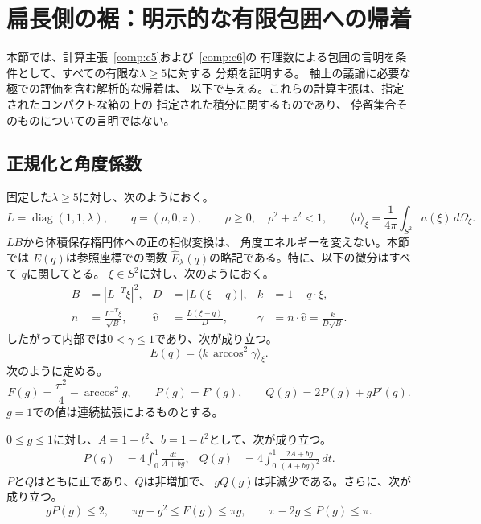 \section{扁長側の裾：明示的な有限包囲への帰着}
\label{sec:prolate-tail}

本節では、計算主張~\ref{comp:c5}および~\ref{comp:c6}の
有理数による包囲の言明を条件として、すべての有限な$\lambda\geq 5$に対する
分類を証明する。
軸上の議論に必要な極での評価を含む解析的な帰着は、
以下で与える。これらの計算主張は、指定されたコンパクトな箱の上の
指定された積分に関するものであり、
停留集合そのものについての言明ではない。

\subsection{正規化と角度係数}
\label{subsec:pt-normalization}

固定した$\lambda\geq 5$に対し、次のようにおく。
\[
 L=\operatorname{diag}(1,1,\lambda),\qquad
 q=(\rho,0,z),\qquad \rho\geq 0,\quad \rho^2+z^2<1,
 \qquad \langle a\rangle_\xi=\frac{1}{4\pi}\int_{S^2}a(\xi)\,d\Omega_\xi .
\]
$LB$から体積保存楕円体への正の相似変換は、
角度エネルギーを変えない。本節では
$E(q)$は参照座標での関数
$\widehat E_\lambda(q)$の略記である。特に、以下の微分はすべて
$q$に関してとる。
$\xi\in S^2$に対し、次のようにおく。
\begin{equation}
\begin{aligned}
 B&=|L^{-T}\xi|^2,&
 D&=|L(\xi-q)|,&
 k&=1-q\cdot\xi,\\
 n&=\frac{L^{-T}\xi}{\sqrt B},&
 \widehat v&=\frac{L(\xi-q)}{D},&
 \gamma&=n\cdot\widehat v=\frac{k}{D\sqrt B}.
\end{aligned}
\label{eq:pt-basic-variables}
\end{equation}
したがって内部では$0<\gamma\leq 1$であり、次が成り立つ。
\[
 E(q)=\langle k\,\arccos^2\gamma\rangle_\xi.
\]
次のように定める。
\begin{equation}
 F(g)=\frac{\pi^2}{4}-\arccos^2g,\qquad
 P(g)=F'(g),\qquad Q(g)=2P(g)+gP'(g).
\label{eq:pt-coefficients}
\end{equation}
$g=1$での値は連続拡張によるものとする。

\begin{lemma}[角度に関する評価]
\label{lem:pt-angular-bounds}
$0\leq g\leq 1$に対し、$A=1+t^2$、$b=1-t^2$として、次が成り立つ。
\begin{align}
 P(g)&=4\int_0^1\frac{dt}{A+bg},&
 Q(g)&=4\int_0^1\frac{2A+bg}{(A+bg)^2}\,dt.
 \label{eq:pt-angular-integrals}
\end{align}
$P$と$Q$はともに正であり、$Q$は非増加で、
$gQ(g)$は非減少である。さらに、次が成り立つ。
\begin{equation}
 gP(g)\leq 2,\qquad
 \pi g-g^2\leq F(g)\leq\pi g,\qquad
 \pi-2g\leq P(g)\leq\pi.
\label{eq:pt-elementary-angular-bounds}
\end{equation}
\end{lemma}

